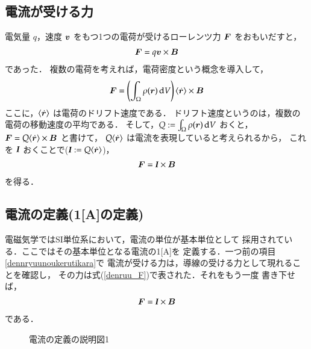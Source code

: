     \subsection{電流が受ける力}
            電気量 $q$，速度 $\boldsymbol{v}$  をもつ1つの電荷が受けるローレンツ力 $\boldsymbol{F}$ をおもいだすと，
            \begin{align}
            \boldsymbol{F}=q\boldsymbol{v}\times\boldsymbol{B}
            \end{align}
            であった．
            複数の電荷を考えれば，電荷密度という概念を導入して，
            \begin{align}
            \boldsymbol{F}=\left(\int_\Omega \rho(\boldsymbol{r})\,\mathrm{d} V\right)
            \langle\dot{\boldsymbol{r}}\rangle\times\boldsymbol{B}
            \end{align}
            ここに，$\langle\dot{\boldsymbol{r}}\rangle$ は電荷のドリフト速度である．
            ドリフト速度というのは，複数の電荷の移動速度の平均である．
            そして，$Q:=\int_\Omega \rho(\boldsymbol{r})\,\mathrm{d} V$ おくと，
            $\boldsymbol{F}=Q
            \langle\dot{\boldsymbol{r}}\rangle\times\boldsymbol{B}$ と書けて，
            $Q\langle\dot{\boldsymbol{r}}\rangle$ は電流を表現していると考えられるから，
            これを $\textit{\textbf{I}}$ おくことで($\textit{\textbf{I}}:= Q\langle\dot{\boldsymbol{r}}\rangle$)，
            \begin{align}
            \boldsymbol{F}=\textit{\textbf{I}}\times\boldsymbol{B}
            \end{align}
            を得る．

    \subsection{電流の定義(1[A]の定義)}\label{denryuuteigi}
            電磁気学ではSI単位系において，電流の単位が基本単位として
            採用されている．ここではその基本単位となる電流の1[A]を
            定義する．一つ前の項目\ref{dennryuunoukerutikara}で
            電流が受ける力は，導線の受ける力として現れることを確認し，
            その力は式(\ref{denruu_F})で表された．それをもう一度
            書き下せば，
                \begin{align}
                    \boldsymbol{F}=\textit{\textbf{I}}\times \boldsymbol{B}
                \end{align}
            である．
            \begin{figure}[hbt]
                    \begin{center}
                        \caption{電流の定義の説明図1}
                        \label{fig:denryu_teigi}
                    \end{center}
                \end{figure}

